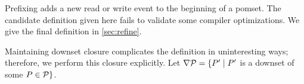 Prefixing adds a new read or write event to the beginning of a pomset.  The
candidate definition given here fails to validate some compiler
optimizations.  We give the final definition in \textsection\ref{sec:refine}.

Maintaining downset closure complicates the definition in uninteresting ways;
therefore, we perform this closure explicitly.  Let
$\nabla \mathcal{P}=\{P'\mid P'$ is a downset of some $P \in \mathcal{P}\}$.
  



  


